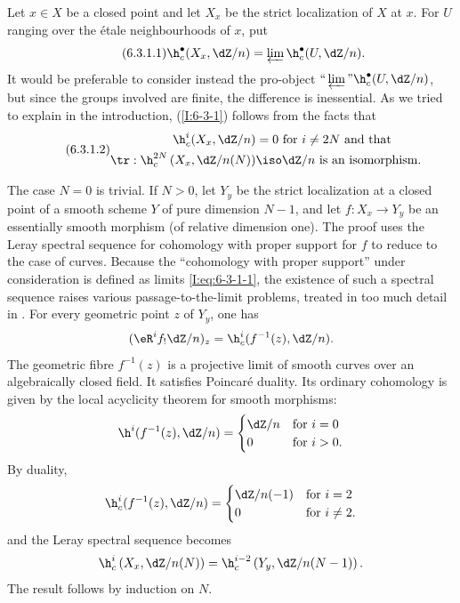 \documentclass[oneside]{book}
\begin{document}
Let $x\in X$ be a closed point and let $X_x$ be the strict localization
of $X$ at $x$. For $U$ ranging over the étale neighbourhoods of $x$,
put
\begin{equation*}\tag{6.3.1.1}\label{I:eq:6-3-1-1}
  \h_c^\bullet(X_x,\dZ/n) = \varprojlim \h_c^\bullet(U,\dZ/n) \text{.}
\end{equation*}
It would be preferable to consider instead the pro-object
$\text{“}\varprojlim\text{”}\h_c^\bullet(U,\dZ/n)$, but since the
groups involved are finite, the difference is inessential. As we tried
to explain in the introduction, (\ref{I:6-3-1}) follows from the facts
that
\begin{equation*}\tag{6.3.1.2}\label{I:eq:6-3-1-2}
\begin{aligned}
  \h_c^i(X_x,\dZ/n) &= 0 \text{ for $i\ne 2N$ and that } \\
  \tr : \h_c^{2 N}\left(X_x,  \dZ/n(N)\right) &\iso \dZ/n \text{ is an isomorphism.}
\end{aligned}
\end{equation*}

The case $N=0$ is trivial. If $N>0$, let $Y_y$ be the strict
localization at a closed point of a smooth scheme $Y$ of pure dimension
$N-1$, and let $f:X_x\to Y_y$ be an essentially smooth morphism (of
relative dimension one). The proof uses the Leray spectral sequence for
cohomology with proper support for $f$ to reduce to the case of curves.
Because the “cohomology with proper support” under consideration is
defined as limits \eqref{I:eq:6-3-1-1}, the existence of such a spectral
sequence raises various passage-to-the-limit problems, treated in too much
detail in \cite[XVIII]{sga4}. For every geometric point $z$ of $Y_y$,
one has
\[
  (\eR^if_! \dZ/n)_z = \h_c^i(f^{-1}(z),\dZ/n) \text{.}
\]
The geometric fibre $f^{-1}(z)$ is a projective limit of smooth curves
over an algebraically closed field. It satisfies Poincaré duality. Its
ordinary cohomology is given by the local acyclicity theorem for smooth
morphisms:
\[
  \h^i(f^{-1}(z),\dZ/n)
    = \begin{cases}
        \dZ/n & \text{for $i=0$} \\
        0     & \text{for $i>0$.}
      \end{cases}
\]
By duality,
\[
  \h_c^i(f^{-1}(z),\dZ/n)
    = \begin{cases}
        \dZ/n(-1) & \text{for $i=2$} \\
        0         & \text{for $i\ne 2$.}
      \end{cases}
\]
and the Leray spectral sequence becomes
\[
  \h_c^i\left(X_x,\dZ/n(N)\right) = \h_c^{i-2}\left(Y_y,\dZ/n(N-1)\right) \text{.}
\]
The result follows by induction on $N$.
\end{document}
